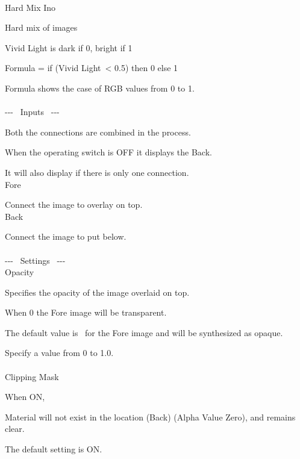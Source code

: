 \documentclass[a4paper,12pt]{article}
\begin{document}
\thispagestyle{empty}

\Large
\noindent \\
Hard Mix Ino\medskip
\par
\normalsize
Hard mix of images\par
Vivid Light is dark if 0, bright if 1\par
Formula = if (\textquotedbl Vivid Light\textquotedbl \ < 0.5) then 0 else 1\par
Formula shows the case of RGB values from 0 to 1.\\
\\
-{-}- \ Inputs \ -{-}-\par
Both the connections are combined in the process.\par
When the operating switch is OFF it displays the Back.\par
It will also display if there is only one connection.\\
Fore\par
Connect the image to overlay on top.\\
Back\par
Connect the image to put below.\\
\\
-{-}- \ Settings \ -{-}-\\
Opacity\par
Specifies the opacity of the image overlaid on top.\par
When 0 the Fore image will be transparent.\par
The default value is \textquotedbl \ for the Fore image and will be synthesized as opaque.\par
Specify a value from 0 to 1.0.\\
\\
Clipping Mask\par
When ON,\par
Material will not exist in the location (Back) (Alpha Value Zero), and remains clear.\par
The default setting is ON.
\end{document}
